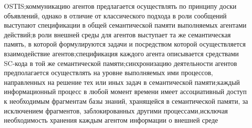 \begin{SCn}
\begin{small}
{OSTIS;коммуникацию агентов предлагается
осуществлять по принципу доски объявлений, однако в отличие от классического
подхода в роли сообщений выступают спецификации в общей семантической памяти выполняемых агентами действий;в роли внешней среды для агентов выступает та же семантическая память, в которой
формулируются задачи и посредством которой
осуществляется взаимодействие агентов;спецификация каждого агента описывается средствами SC-кода в той же семантической памяти;синхронизацию деятельности агентов
предполагается осуществлять на уровне выполняемых ими процессов, направленных на
решение тех или иных задач в семантической
памяти;каждый информационный процесс в любой момент времени имеет ассоциативный доступ к необходимым фрагментам базы знаний,
хранящейся в семантической памяти, за исключением фрагментов, заблокированных другими
процессами,исключая необходимость хранения
каждым агентом информации о внешней среде}



\end{small}
\end{SCn}
